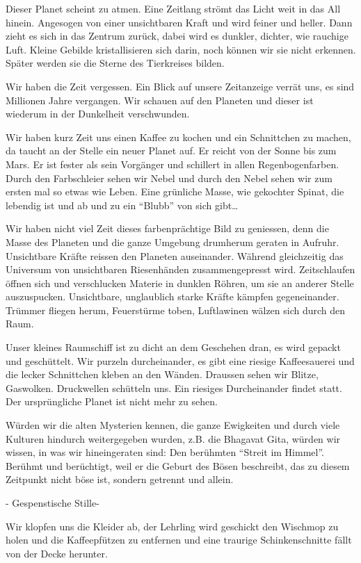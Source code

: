 \documentclass[11pt,titlepage,a5paper]{book}
\begin{document}
Dieser Planet scheint zu atmen. Eine Zeitlang strömt das Licht weit in das All hinein. Angesogen von einer unsichtbaren Kraft und wird feiner und heller. Dann zieht es sich in das Zentrum zurück, dabei wird es dunkler, dichter, wie rauchige Luft. Kleine Gebilde kristallisieren sich darin, noch können wir sie nicht erkennen. Später werden sie die Sterne des Tierkreises bilden.

Wir haben die Zeit vergessen. Ein Blick auf unsere Zeitanzeige verrät uns, es sind Millionen Jahre vergangen. Wir schauen auf den Planeten und dieser ist wiederum in der Dunkelheit verschwunden.

Wir haben kurz Zeit uns einen Kaffee zu kochen und ein Schnittchen zu machen, da taucht an der Stelle ein neuer Planet auf. Er reicht von der Sonne bis zum Mars. Er ist fester als sein Vorgänger und schillert in allen Regenbogenfarben. Durch den Farbschleier sehen wir Nebel und durch den Nebel sehen wir zum ersten mal so etwas wie Leben. Eine grünliche Masse, wie gekochter Spinat, die lebendig ist und ab und zu ein "`Blubb"' von sich gibt\dots

Wir haben nicht viel Zeit dieses farbenprächtige Bild zu geniessen, denn die Masse des Planeten und die ganze Umgebung drumherum geraten in Aufruhr. Unsichtbare Kräfte reissen den Planeten auseinander. Während gleichzeitig das Universum von unsichtbaren Riesenhänden zusammengepresst wird. Zeitschlaufen öffnen sich und verschlucken Materie in dunklen Röhren, um sie an anderer Stelle auszuspucken. Unsichtbare, unglaublich starke Kräfte kämpfen gegeneinander. Trümmer fliegen herum, Feuerstürme toben, Luftlawinen wälzen sich durch den Raum.

Unser kleines Raumschiff ist zu dicht an dem Geschehen dran, es wird gepackt und geschüttelt. Wir purzeln durcheinander, es gibt eine riesige Kaffeesauerei und die lecker Schnittchen kleben an den Wänden. Draussen sehen wir Blitze, Gaswolken. Druckwellen schütteln uns. Ein riesiges Durcheinander findet statt. Der ursprüngliche Planet ist nicht mehr zu sehen.

Würden wir die alten Mysterien kennen, die ganze Ewigkeiten und durch viele Kulturen hindurch weitergegeben wurden, z.B. die Bhagavat Gita, würden wir wissen, in was wir hineingeraten sind: Den berühmten "`Streit im Himmel"'. Berühmt und berüchtigt, weil er die Geburt des Bösen beschreibt, das zu diesem Zeitpunkt nicht böse ist, sondern getrennt und allein.

- Gespenstische Stille-

Wir klopfen uns die Kleider ab, der Lehrling wird geschickt den Wischmop zu holen und die Kaffeepfützen zu entfernen und eine traurige Schinkenschnitte fällt von der Decke herunter.
\end{document}
